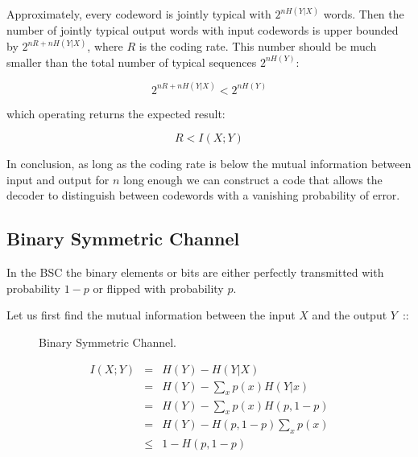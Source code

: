 Approximately, every codeword is jointly typical with $2^{nH(Y|X)}$ words. Then the number of jointly typical output words with input codewords is upper bounded by $2^{nR+nH(Y|X)}$, where $R$ is the coding rate. This number should be much smaller than the total number of typical sequences $2^{nH(Y)}$:
 
\begin{equation*}
2^{nR+nH(Y|X)} < 2^{nH(Y)}
\end{equation*}

\noindent which operating returns the expected result:

\begin{equation*}
R < I(X;Y)
\end{equation*}

In conclusion, as long as the coding rate is below the mutual information between input and output for $n$ long enough we can construct a code that allows the decoder to distinguish between codewords with a vanishing probability of error.


\subsection{Binary Symmetric Channel}
In the {BSC} the binary elements or bits are either perfectly transmitted with probability $1-p$ or flipped with probability $p$. 

Let us first find the mutual information between the input $X$ and the output $Y$~\cite{Cover_91}::

\begin{figure}[h]
\begin{center}
\def\svgwidth{\columnwidth} 
 
\caption{Binary Symmetric Channel.}
\label{fig:bsc}
\end{center}
\end{figure}

\begin{eqnarray}
I(X;Y) &=& H(Y) - H(Y|X) \\
         &=& H(Y) - \sum_x p(x)H(Y|x) \\
         &=& H(Y) - \sum_x p(x)H(p,1-p) \\
         &=& H(Y) - H(p,1-p)\sum_x p(x) \\
         &\leq & 1 - H(p,1-p)\label{eq:bscC} 
\end{eqnarray}


